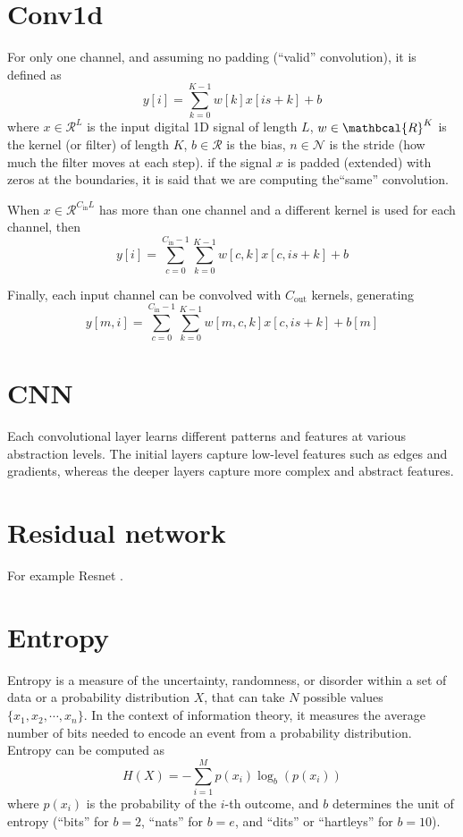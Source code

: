 \section{Conv1d}
For only one channel, and assuming no padding (``valid'' convolution), it is defined as
\begin{equation}
  y[i] = \sum_{k=0}^{K-1} w[k]x[is+k]+b
\end{equation}
where $x\in\mathcal{R}^L$ is the input digital 1D signal of length
$L$, $w\in\mathbcal{R}^K$ is the kernel (or filter) of length $K$,
$b\in\mathcal{R}$ is the bias, $n\in\mathcal{N}$ is the stride (how
much the filter moves at each step). if the signal $x$ is padded
(extended) with zeros at the boundaries, it is said that we are
computing the``same'' convolution.

When $x\in\mathcal{R}^{C_{\text{in}}L}$ has more than one channel and
a different kernel is used for each channel, then
\begin{equation}
  y[i] = \sum_{c=0}^{C_{\text{in}}-1}\sum_{k=0}^{K-1} w[c,k]x[c,is+k]+b
\end{equation}

Finally, each input channel can be convolved with $C_{\text{out}}$ kernels, generating
\begin{equation}
  y[m,i] = \sum_{c=0}^{C_{\text{in}}-1}\sum_{k=0}^{K-1} w[m,c,k]x[c,is+k]+b[m]
\end{equation}

\section{CNN}
Each convolutional layer learns different patterns and features at
various abstraction levels. The initial layers capture low-level features such
as edges and gradients, whereas the deeper layers capture more complex and
abstract features.

\section{Residual network}
For example Resnet \cite{}.

\section{Entropy}
Entropy is a measure of the uncertainty, randomness, or disorder
within a set of data or a probability distribution $X$, that can take
$N$ possible values $\{x_1,x_2,\cdots,x_n\}$. In the context of
information theory, it measures the average number of bits needed to
encode an event from a probability distribution. Entropy can be
computed as
\begin{equation}
  H(X) = -\sum_{i=1}^Mp(x_i)\log_b(p(x_i))
\end{equation}
where $p(x_i)$ is the probability of the $i$-th outcome, and $b$
determines the unit of entropy (``bits'' for $b=2$, ``nats'' for
$b=e$, and ``dits'' or ``hartleys'' for $b=10$).


